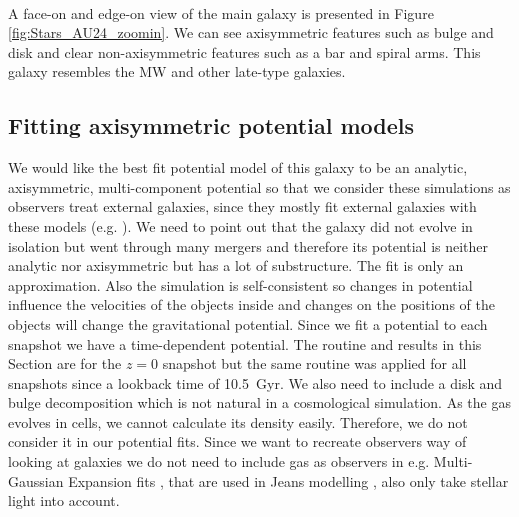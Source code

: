 \\A face-on and edge-on view of the main galaxy is presented in Figure \ref{fig:Stars_AU24_zoomin}. We can see axisymmetric features such as bulge and disk and clear non-axisymmetric features such as a bar and spiral arms. This galaxy resembles the \ac{MW} and other late-type galaxies.
\subsection{Fitting axisymmetric potential models}\label{subsec:best_fit_pot}
We would like the best fit potential model of this galaxy to be an analytic, axisymmetric, multi-component potential so that we consider these simulations as observers treat external galaxies, since they mostly fit external galaxies with these models (e.g. \citealp{Geehan...Andromedapot...2006}). We need to point out that the galaxy did not evolve in isolation but went through many mergers and therefore its potential is neither analytic nor axisymmetric but has a lot of substructure. The fit is only an approximation. Also the simulation is self-consistent so changes in potential influence the velocities of the objects inside and changes on the positions of the objects will change the gravitational potential. Since we fit a potential to each snapshot we have a time-dependent potential. The routine and results in this Section are for the $z=0$ snapshot but the same routine was applied for all snapshots since a lookback time of \SI{10.5}{Gyr}. We also need to include a disk and bulge decomposition which is not natural in a cosmological simulation. As the gas evolves in cells, we cannot calculate its density easily. Therefore, we do not consider it in our potential fits. Since we want to recreate observers way of looking at galaxies we do not need to include gas as observers in e.g. Multi-Gaussian Expansion fits \citep{MGE...Monnet, MGE...Emsellem}, that are used in Jeans modelling \citep{Cappellari...Jeans....2008, Glenn....einsteincross...2010}, also only take stellar light into account. 

